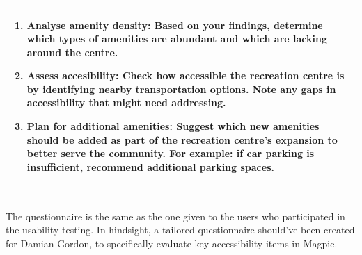 \begin{table}[h!]
\begin{tabular}{|p{\textwidth}|}
\begin{enumerate}
            \item \textbf{Analyse amenity density:} Based on your findings, determine which types of amenities are abundant and which are lacking around the centre.
            \item \textbf{Assess accesibility:} Check how accessible the recreation centre is by identifying nearby transportation options. Note any gaps in accessibility that might need addressing.
            \item \textbf{Plan for additional amenities:} Suggest which new amenities should be added as part of the recreation centre's expansion to better serve the community. For example: if car parking is insufficient, recommend additional parking spaces.
        \end{enumerate}                                              \\
        \hline
    \end{tabular}
\end{table}
\\
The questionnaire is the same as the one given to the users who participated in the usability testing. In hindsight, a tailored questionnaire should've been created for Damian Gordon, to specifically evaluate key accessibility items in Magpie.
\\\\

